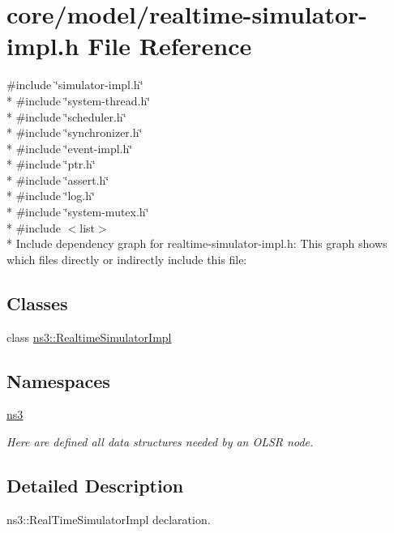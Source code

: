 \hypertarget{realtime-simulator-impl_8h}{}\section{core/model/realtime-\/simulator-\/impl.h File Reference}
\label{realtime-simulator-impl_8h}
{\ttfamily \#include \char`\"{}simulator-\/impl.\+h\char`\"{}}\\*
{\ttfamily \#include \char`\"{}system-\/thread.\+h\char`\"{}}\\*
{\ttfamily \#include \char`\"{}scheduler.\+h\char`\"{}}\\*
{\ttfamily \#include \char`\"{}synchronizer.\+h\char`\"{}}\\*
{\ttfamily \#include \char`\"{}event-\/impl.\+h\char`\"{}}\\*
{\ttfamily \#include \char`\"{}ptr.\+h\char`\"{}}\\*
{\ttfamily \#include \char`\"{}assert.\+h\char`\"{}}\\*
{\ttfamily \#include \char`\"{}log.\+h\char`\"{}}\\*
{\ttfamily \#include \char`\"{}system-\/mutex.\+h\char`\"{}}\\*
{\ttfamily \#include $<$list$>$}\\*
Include dependency graph for realtime-\/simulator-\/impl.h\+:
This graph shows which files directly or indirectly include this file\+:
\subsection*{Classes}
\begin{DoxyCompactItemize}
\item 
class \hyperlink{classns3_1_1RealtimeSimulatorImpl}{ns3\+::\+Realtime\+Simulator\+Impl}
\end{DoxyCompactItemize}
\subsection*{Namespaces}
\begin{DoxyCompactItemize}
\item 
 \hyperlink{namespacens3}{ns3}
\begin{DoxyCompactList}\small\item\em Here are defined all data structures needed by an O\+L\+SR node. \end{DoxyCompactList}\end{DoxyCompactItemize}


\subsection{Detailed Description}
ns3\+::\+Real\+Time\+Simulator\+Impl declaration. 